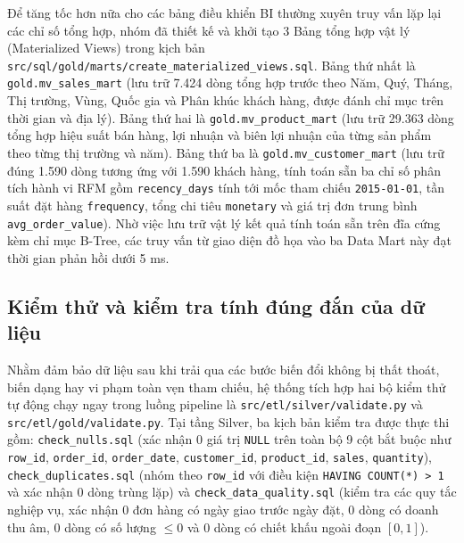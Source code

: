 Để tăng tốc hơn nữa cho các bảng điều khiển BI thường xuyên truy vấn lặp lại các chỉ số tổng hợp, nhóm đã thiết kế và khởi tạo 3 Bảng tổng hợp vật lý (Materialized Views) trong kịch bản \texttt{src/sql/gold/marts/create\_materialized\_views.sql}. Bảng thứ nhất là \texttt{gold.mv\_sales\_mart} (lưu trữ 7.424 dòng tổng hợp trước theo Năm, Quý, Tháng, Thị trường, Vùng, Quốc gia và Phân khúc khách hàng, được đánh chỉ mục trên thời gian và địa lý). Bảng thứ hai là \texttt{gold.mv\_product\_mart} (lưu trữ 29.363 dòng tổng hợp hiệu suất bán hàng, lợi nhuận và biên lợi nhuận của từng sản phẩm theo từng thị trường và năm). Bảng thứ ba là \texttt{gold.mv\_customer\_mart} (lưu trữ đúng 1.590 dòng tương ứng với 1.590 khách hàng, tính toán sẵn ba chỉ số phân tích hành vi RFM gồm \texttt{recency\_days} tính tới mốc tham chiếu \texttt{2015-01-01}, tần suất đặt hàng \texttt{frequency}, tổng chi tiêu \texttt{monetary} và giá trị đơn trung bình \texttt{avg\_order\_value}). Nhờ việc lưu trữ vật lý kết quả tính toán sẵn trên đĩa cứng kèm chỉ mục B-Tree, các truy vấn từ giao diện đồ họa vào ba Data Mart này đạt thời gian phản hồi dưới 5 ms.

\subsection{Kiểm thử và kiểm tra tính đúng đắn của dữ liệu}

Nhằm đảm bảo dữ liệu sau khi trải qua các bước biến đổi không bị thất thoát, biến dạng hay vi phạm toàn vẹn tham chiếu, hệ thống tích hợp hai bộ kiểm thử tự động chạy ngay trong luồng pipeline là \texttt{src/etl/silver/validate.py} và \texttt{src/etl/gold/validate.py}. Tại tầng Silver, ba kịch bản kiểm tra được thực thi gồm: \texttt{check\_nulls.sql} (xác nhận 0 giá trị \texttt{NULL} trên toàn bộ 9 cột bắt buộc như \texttt{row\_id}, \texttt{order\_id}, \texttt{order\_date}, \texttt{customer\_id}, \texttt{product\_id}, \texttt{sales}, \texttt{quantity}), \texttt{check\_duplicates.sql} (nhóm theo \texttt{row\_id} với điều kiện \texttt{HAVING COUNT(*) > 1} và xác nhận 0 dòng trùng lặp) và \texttt{check\_data\_quality.sql} (kiểm tra các quy tắc nghiệp vụ, xác nhận 0 đơn hàng có ngày giao trước ngày đặt, 0 dòng có doanh thu âm, 0 dòng có số lượng $\le 0$ và 0 dòng có chiết khấu ngoài đoạn $[0, 1]$).

